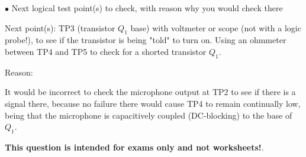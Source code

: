 \medskip
\goodbreak
\item{$\bullet$} Next logical test point(s) to check, with reason why you would check there
\item{Next point(s):} TP3 (transistor $Q_1$ base) with voltmeter or scope (not with a logic probe!), to see if the transistor is being "told" to turn on.  Using an ohmmeter between TP4 and TP5 to check for a shorted transistor $Q_1$.
\item{Reason:}
\medskip

It would be incorrect to check the microphone output at TP2 to see if there is a signal there, because no failure there would cause TP4 to remain continually low, being that the microphone is capacitively coupled (DC-blocking) to the base of $Q_1$.







{\bf This question is intended for exams only and not worksheets!}.




